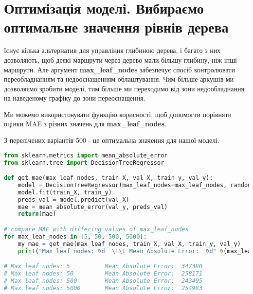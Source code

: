 \chapter{Оптимізація моделі. Вибираємо оптимальне значення рівнів дерева}\label{cha:selecting_number_of_leafs}
Існує кілька альтернатив для управління глибиною дерева, і багато з них дозволяють, щоб деякі маршрути через дерево мали більшу глибину, ніж інші маршрути.
Але аргумент \textbf{max\_leaf\_nodes} забезпечує спосіб контролювати переобладнанням та недооснащенням облаштування.
Чим більше аркушів ми дозволяємо зробити моделі, тим більше ми переходимо від зони недообладнання на наведеному графіку до зони переоснащення.

Ми можемо використовувати функцію корисності, щоб допомогти порівняти оцінки MAE з різних значень для \textbf{max\_leaf\_nodes}.

З перелічених варіантів 500 - це оптимальна значення для нашої моделі.

\begin{lstlisting}[style=light, language=Python,label={lst:vectorimg},caption=Computing MAE for different value of leaf nodes]
from sklearn.metrics import mean_absolute_error
from sklearn.tree import DecisionTreeRegressor

def get_mae(max_leaf_nodes, train_X, val_X, train_y, val_y):
    model = DecisionTreeRegressor(max_leaf_nodes=max_leaf_nodes, random_state=0)
    model.fit(train_X, train_y)
    preds_val = model.predict(val_X)
    mae = mean_absolute_error(val_y, preds_val)
    return(mae)

# compare MAE with differing values of max_leaf_nodes
for max_leaf_nodes in [5, 50, 500, 5000]:
    my_mae = get_mae(max_leaf_nodes, train_X, val_X, train_y, val_y)
    print("Max leaf nodes: %d  \t\t Mean Absolute Error:  %d" %(max_leaf_nodes, my_mae))

# Max leaf nodes: 5  		 Mean Absolute Error:  347380
# Max leaf nodes: 50  		 Mean Absolute Error:  258171
# Max leaf nodes: 500  		 Mean Absolute Error:  243495
# Max leaf nodes: 5000       Mean Absolute Error:  254983
\end{lstlisting}
